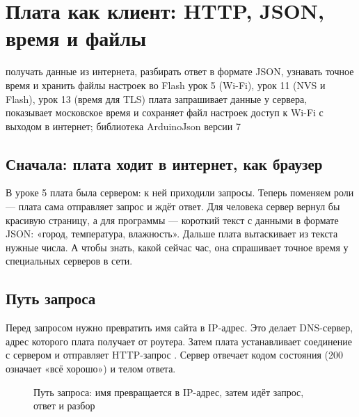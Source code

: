 \section{Плата как клиент: HTTP, JSON, время и файлы}
\lessonintro
  {получать данные из интернета, разбирать ответ в формате JSON, узнавать точное время и хранить файлы настроек во Flash}
  {урок 5 (Wi-Fi), урок 11 (NVS и Flash), урок 13 (время для TLS)}
  {плата запрашивает данные у сервера, показывает московское время и сохраняет файл настроек}
  {доступ к Wi-Fi с выходом в интернет; библиотека ArduinoJson версии 7}

\subsection{Сначала: плата ходит в интернет, как браузер}

В уроке 5 плата была сервером: к ней приходили запросы. Теперь поменяем роли --- плата сама отправляет
запрос и ждёт ответ. Для человека сервер вернул бы красивую страницу, а для программы --- короткий текст
с данными в формате JSON: «город, температура, влажность». Дальше плата вытаскивает из текста нужные числа.
А чтобы знать, какой сейчас час, она спрашивает точное время у специальных серверов в сети.

\subsection{Путь запроса}

Перед запросом нужно превратить имя сайта в IP-адрес. Это делает DNS-сервер, адрес которого плата
получает от роутера. Затем плата устанавливает соединение с сервером и отправляет HTTP-запрос
. Сервер отвечает кодом состояния (200 означает «всё хорошо») и телом ответа.

\begin{figure}[H]
\centering
{}
\caption{Путь запроса: имя превращается в IP-адрес, затем идёт запрос, ответ и разбор}
\end{figure}

